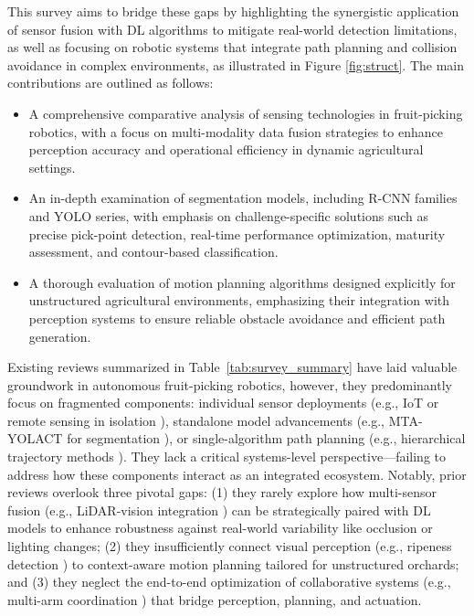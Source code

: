 \documentclass[a4paper,fleqn]{cas-dc}
\begin{document}
This survey aims to bridge these gaps by highlighting the synergistic application of sensor fusion with DL algorithms to mitigate real-world detection limitations, as well as focusing on robotic systems that integrate path planning and collision avoidance in complex environments, as illustrated in Figure \ref{fig:struct}. The main contributions are outlined as follows:
\begin{itemize}
\item A comprehensive comparative analysis of sensing technologies in fruit-picking robotics, with a focus on multi-modality data fusion strategies to enhance perception accuracy and operational efficiency in dynamic agricultural settings.
\item An in-depth examination of segmentation models, including R-CNN families and YOLO series, with emphasis on challenge-specific solutions such as precise pick-point detection, real-time performance optimization, maturity assessment, and contour-based classification.
\item A thorough evaluation of motion planning algorithms designed explicitly for unstructured agricultural environments, emphasizing their integration with perception systems to ensure reliable obstacle avoidance and efficient path generation.
\end{itemize}
\fi

Existing reviews summarized in Table~\ref{tab:survey_summary} have laid valuable groundwork in autonomous fruit-picking robotics, however, they predominantly focus on fragmented components: individual sensor deployments (e.g., IoT or remote sensing in isolation \cite{mohamed2021smart,martos2021ensuring}), standalone model advancements (e.g., MTA-YOLACT for segmentation \cite{li2023mta}), or single-algorithm path planning (e.g., hierarchical trajectory methods \cite{liu2024hierarchical}). 
They lack a critical systems-level perspective—failing to address how these components interact as an integrated ecosystem.
Notably, prior reviews overlook three pivotal gaps: (1) they rarely explore how multi-sensor fusion (e.g., LiDAR-vision integration \cite{liu2024hierarchical}) can be strategically paired with DL models to enhance robustness against real-world variability like occlusion or lighting changes; (2) they insufficiently connect visual perception (e.g., ripeness detection \cite{hou2023overview}) to context-aware motion planning tailored for unstructured orchards; and (3) they neglect the end-to-end optimization of collaborative systems (e.g., multi-arm coordination \cite{li2023multi}) that bridge perception, planning, and actuation.
\end{document}
